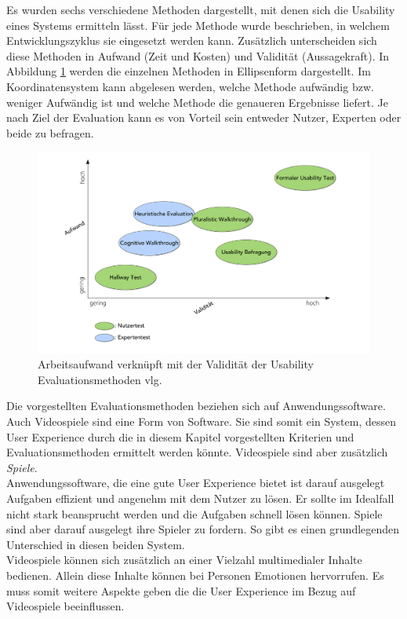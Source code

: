Es wurden sechs verschiedene Methoden dargestellt, mit denen sich die Usability eines Systems ermitteln lässt. Für jede Methode wurde beschrieben, in welchem Entwicklungszyklus sie eingesetzt werden kann. Zusätzlich unterscheiden sich diese Methoden in Aufwand (Zeit und Kosten) und Validität (Aussagekraft).  In Abbildung \ref{pic:AufwandUndVal} werden die einzelnen Methoden in Ellipsenform dargestellt. Im Koordinatensystem kann abgelesen werden, welche Methode aufwändig bzw. weniger Aufwändig ist und welche Methode die genaueren Ergebnisse liefert. Je nach Ziel der Evaluation kann es von Vorteil sein entweder Nutzer, Experten oder beide zu befragen.
\begin{figure}[H]
    \centering
    \includegraphics[trim=80 35 90 20,clip,width=1\textwidth]{files/usa/validitaet}
    \caption{Arbeitsaufwand verknüpft mit der Validität der Usability Evaluationsmethoden vlg.  \cite[S. 225]{Moser:2012cn}}
    \label{pic:AufwandUndVal}
\end{figure}
Die vorgestellten Evaluationsmethoden beziehen sich auf Anwendungssoftware. Auch Videospiele sind eine Form von Software. Sie sind somit ein System, dessen User Experience durch die in diesem Kapitel vorgestellten Kriterien und Evaluationsmethoden ermittelt werden könnte. Videospiele sind aber zusätzlich \textit{Spiele}. \\
Anwendungssoftware, die eine gute User Experience bietet ist darauf ausgelegt Aufgaben effizient und angenehm mit dem Nutzer zu lösen. Er sollte im Idealfall nicht stark beansprucht werden und die Aufgaben schnell lösen können. Spiele sind aber darauf ausgelegt ihre Spieler zu fordern. So gibt es einen grundlegenden Unterschied in diesen beiden System. \\
Videospiele können sich zusätzlich an einer Vielzahl multimedialer Inhalte bedienen. Allein diese Inhalte können bei Personen Emotionen hervorrufen. Es muss somit weitere Aspekte geben die die User Experience im Bezug auf Videospiele beeinflussen.
